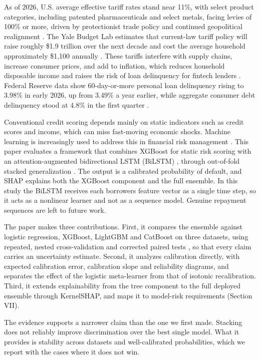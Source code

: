 \documentclass[conference,a4paper]{IEEEtran}
\begin{document}
As of 2026, U.S. average effective tariff rates stand near 11\%, with select product categories, including patented pharmaceuticals and select metals, facing levies of 100\% or more, driven by protectionist trade policy and continued geopolitical realignment \cite{r9}. The Yale Budget Lab estimates that current-law tariff policy will raise roughly \$1.9 trillion over the next decade and cost the average household approximately \$1,100 annually \cite{r9}. These tariffs interfere with supply chains, increase consumer prices, and add to inflation, which reduces household disposable income and raises the risk of loan delinquency for fintech lenders \cite{r13}. Federal Reserve data show 60-day-or-more personal loan delinquency rising to 3.98\% in early 2026, up from 3.49\% a year earlier, while aggregate consumer debt delinquency stood at 4.8\% in the first quarter \cite{r10,r11,r12}.

Conventional credit scoring depends mainly on static indicators such as credit scores and income, which can miss fast-moving economic shocks. Machine learning is increasingly used to address this in financial risk management \cite{r16}. This paper evaluates a framework that combines XGBoost \cite{r2} for static risk scoring with an attention-augmented bidirectional LSTM (BiLSTM) \cite{r1,r3}, through out-of-fold stacked generalization \cite{r5}. The output is a calibrated probability of default, and SHAP \cite{r4} explains both the XGBoost component and the full ensemble. In this study the BiLSTM receives each borrower\textquotesingle s feature vector as a single time step, so it acts as a nonlinear learner and not as a sequence model. Genuine repayment sequences are left to future work.

The paper makes three contributions. First, it compares the ensemble against logistic regression, XGBoost, LightGBM and CatBoost on three datasets, using repeated, nested cross-validation and corrected paired tests \cite{r25}, so that every claim carries an uncertainty estimate. Second, it analyzes calibration directly, with expected calibration error, calibration slope and reliability diagrams, and separates the effect of the logistic meta-learner from that of isotonic recalibration. Third, it extends explainability from the tree component to the full deployed ensemble through KernelSHAP, and maps it to model-risk requirements (Section VII).

The evidence supports a narrower claim than the one we first made. Stacking does not reliably improve discrimination over the best single model. What it provides is stability across datasets and well-calibrated probabilities, which we report with the cases where it does not win.
\end{document}
